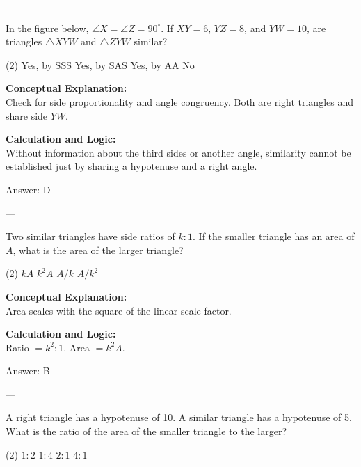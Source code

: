 \documentclass[11pt,paper=a4,answers]{exam}
\begin{document}
\begin{questions}
---

\question
In the figure below, $\angle X = \angle Z = 90^\circ$. If $XY = 6$, $YZ = 8$, and $YW = 10$, are triangles $\triangle XYW$ and $\triangle ZYW$ similar?
\begin{tasks}(2)
    \task Yes, by SSS
    \task Yes, by SAS
    \task Yes, by AA
    \task No
\end{tasks}

\begin{solution}
\textbf{Conceptual Explanation:} \\
Check for side proportionality and angle congruency. Both are right triangles and share side $YW$.

\vspace{10pt}
\textbf{Calculation and Logic:} \\
Without information about the third sides or another angle, similarity cannot be established just by sharing a hypotenuse and a right angle.

\vspace{15pt}
Answer: \colorbox{yellow!100}{D}
\end{solution}

---

\question
Two similar triangles have side ratios of $k:1$. If the smaller triangle has an area of $A$, what is the area of the larger triangle?
\begin{tasks}(2)
    \task $kA$
    \task $k^2A$
    \task $A/k$
    \task $A/k^2$
\end{tasks}

\begin{solution}
\textbf{Conceptual Explanation:} \\
Area scales with the square of the linear scale factor.

\vspace{10pt}
\textbf{Calculation and Logic:} \\
Ratio $= k^2 : 1$. Area $= k^2A$.

\vspace{15pt}
Answer: \colorbox{yellow!100}{B}
\end{solution}

---

\question
A right triangle has a hypotenuse of 10. A similar triangle has a hypotenuse of 5. What is the ratio of the area of the smaller triangle to the larger?
\begin{tasks}(2)
    \task $1:2$
    \task $1:4$
    \task $2:1$
    \task $4:1$
\end{tasks}


\end{questions}
\end{document}
